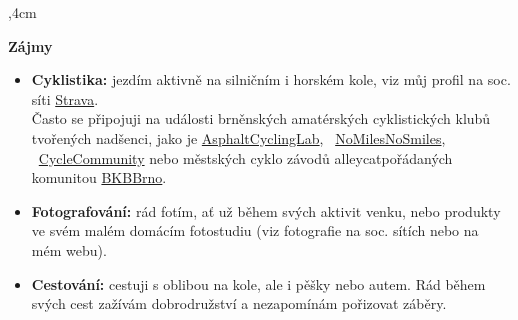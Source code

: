 \documentclass[10pt]{article}
\begin{document}
\noindent\hrulefill
{},4cm

\textbf{Zájmy}
\begin{itemize}
    \item \textbf{Cyklistika:} jezdím aktivně na silničním i horském kole, viz můj profil na soc. síti \href{https://www.strava.com/athletes/40559859}{Strava}. \\
    Často se připojuji na události brněnských amatérských cyklistických klubů tvořených nadšenci, jako je \href{https://asphaltcyclinglab.exposure.co}{AsphaltCyclingLab}, 
    \ \href{https://nomilesnosmiles.com}{NoMilesNoSmiles}, \ \href{https://cyclecommunity.cz}{CycleCommunity} 
    nebo městských cyklo závodů \glqq alleycat\grqq pořádaných komunitou \href{https://bikekitchenbrno.cz}{BKBBrno}.
    \item \textbf{Fotografování:} rád fotím, ať už během svých aktivit venku, nebo produkty ve svém malém domácím fotostudiu (viz fotografie na soc. sítích nebo na mém webu).
    \item \textbf{Cestování:} cestuji s oblibou na kole, ale i pěšky nebo autem. Rád během svých cest zažívám dobrodružství a nezapomínám pořizovat záběry.
\end{itemize}
\end{document}
